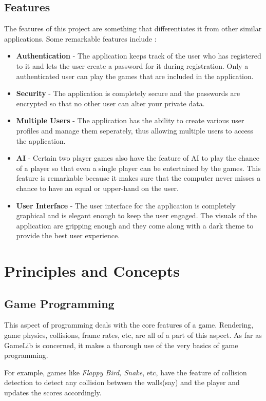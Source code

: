 \documentclass[12pt]{article}
\begin{document}
		\subsection{Features}
		\begin{flushleft}
			\setlength{\parindent}{10ex}
			The features of this project are something that differentiates it from other similar applications. Some remarkable features include :
			\begin{itemize}
				\item {\bf Authentication} - The application keeps track of the user who has registered to it and lets the user create a password for it during registration. Only a authenticated user can play the games that are included in the application.
				\item {\bf Security} - The application is completely secure and the passwords are encrypted so that no other user can alter your private data.
				\item {\bf Multiple Users} - The application has the ability to create various user profiles and manage them seperately, thus allowing multiple users to access the application.
				\item {\bf AI} - Certain two player games also have the feature of AI to play the chance of a player so that even a single player can be entertained by the games. This feature is remarkable because it makes sure that the computer never misses a chance to have an equal or upper-hand on the user.
				\item {\bf User Interface} - The user interface for the application is completely graphical and is elegant enough to keep the user engaged. The visuals of the application are gripping enough and they come along with a dark theme to provide the best user experience.
			\end{itemize}
		\end{flushleft}
		
		\clearpage
		
		\section{Principles and Concepts}
		\subsection{Game Programming}
		\begin{flushleft}
			\setlength{\parindent}{10ex}
			 This aspect of programming deals with the core features of a game. Rendering, game physics, collisions, frame rates, etc, are all of a part of this aspect. As far as GameLib is concerned, it makes a thorough use of the very basics of game programming. \par
			 For example, games like {\it Flappy Bird, Snake}, etc, have the feature of collision detection to detect any collision between the walls(say) and the player and updates the scores accordingly.
		\end{flushleft}
\end{document}
